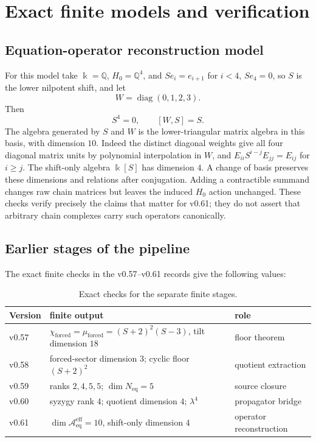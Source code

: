 \documentclass[11pt]{amsart}
\theoremstyle{definition}
\newcommand{\kk}{\Bbbk}
\newcommand{\Q}{\mathbb Q}
\newcommand{\Aeff}{\mathscr A_{\mathrm{eq}}^{\mathrm{eff}}}
\newcommand{\Neq}{N_{\mathrm{eq}}}
\newcommand{\forced}{\mathrm{forced}}
\begin{document}
\section{Exact finite models and verification}

\subsection{Equation-operator reconstruction model}

For this model take \(\kk=\Q\), \(H_0=\Q^4\), and
\(Se_i=e_{i+1}\) for \(i<4\), \(Se_4=0\), so \(S\) is the lower nilpotent shift, and let
\[
W=\operatorname{diag}(0,1,2,3).
\]
Then
\[
S^4=0,
\qquad
[W,S]=S.
\]
The algebra generated by \(S\) and \(W\) is the lower-triangular matrix algebra in this basis,
with dimension \(10\). Indeed the distinct diagonal weights give all four diagonal
matrix units by polynomial interpolation in \(W\), and
\(E_{ii}S^{i-j}E_{jj}=E_{ij}\) for \(i\ge j\).
The shift-only algebra \(\kk[S]\) has dimension \(4\). A change of basis
preserves these dimensions and relations after conjugation. Adding a contractible summand changes
raw chain matrices but leaves the induced \(H_0\) action unchanged. These checks verify precisely
the claims that matter for v0.61; they do not assert that arbitrary chain complexes carry such
operators canonically.

\subsection{Earlier stages of the pipeline}

The exact finite checks in the v0.57--v0.61 records \cite{PartIIIRecords}
give the following values:
\begin{table}[ht]
\centering
\caption{Exact checks for the separate finite stages.}
\label{tab:finite-checks}
\small
\begin{tabular}{@{}lll@{}}
\toprule
Version & finite output & role \\
\midrule
v0.57 & \(\chi_{\forced}=\mu_{\forced}=(S+2)^2(S-3)\), tilt dimension \(18\) & floor theorem \\
v0.58 & forced-sector dimension \(3\); cyclic floor \((S+2)^2\) & quotient extraction \\
v0.59 & ranks \(2,4,5,5\); \(\dim\Neq=5\) & source closure \\
v0.60 & syzygy rank \(4\); quotient dimension \(4\); \(\lambda^4\) & propagator bridge \\
v0.61 & \(\dim\Aeff=10\), shift-only dimension \(4\) & operator reconstruction \\
\bottomrule
\end{tabular}
\end{table}
\end{document}
